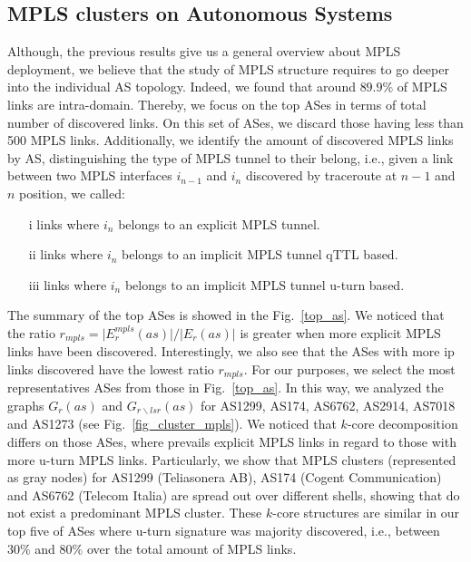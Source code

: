 \subsection{MPLS clusters on Autonomous Systems}\label{cluster.as}
Although, the previous results give us a general overview about MPLS deployment,
we believe that the study of MPLS structure requires to go deeper into the
individual AS topology. Indeed, we found that around $89.9\%$ of MPLS links are intra-domain. Thereby, we focus on the top ASes in terms of total
number of discovered links.  On this set of ASes, we discard those having less
than 500 MPLS links. Additionally, we identify the amount of discovered MPLS
links by AS, distinguishing the type of MPLS tunnel to their belong, i.e., given
a link between two MPLS interfaces $i_{n-1}$  and $i_{n}$ discovered by 
traceroute at $n-1$ and $n$ position, we called:

\begin{itemize}
  \item[i]  links 
  where $i_{n}$ belongs  to an explicit MPLS tunnel.
  \item[ii]  links 
  where $i_{n}$ belongs  to an implicit MPLS tunnel qTTL based.
  \item[iii]  links 
  where $i_{n}$ belongs  to an implicit MPLS tunnel u-turn based.
\end{itemize}

The summary of the top ASes is showed in the Fig.~\ref{top_as}.
We noticed that the ratio $r_{mpls}= \vert E^{mpls}_{r} (as) \vert /\vert E_{r}
(as) \vert $  is greater when more  explicit MPLS links have been
discovered. Interestingly, we also see that the ASes with more ip links discovered
have the lowest ratio $r_{mpls}$. For our purposes, we select the most representatives ASes from those in Fig.~\ref{top_as}. In this way, we analyzed the graphs $G_{r}(as)$ and
$G_{r\backslash lsr}(as)$ for AS1299, AS174, AS6762, AS2914, AS7018 and AS1273 (see Fig.~\ref{fig_cluster_mpls}). We noticed that $k$-core decomposition
differs on those ASes, where prevails explicit MPLS links in regard to those with more u-turn MPLS links. Particularly, we show that MPLS clusters
(represented as gray nodes) for  AS1299 (Teliasonera AB), AS174 (Cogent
Communication) and AS6762 (Telecom Italia) are spread out over different shells, showing that do not
exist a predominant MPLS cluster.
These $k$-core structures are similar in our top five of ASes where u-turn signature was majority discovered, i.e., between $30\%$ and  $80\%$ over  the total amount of MPLS links.

